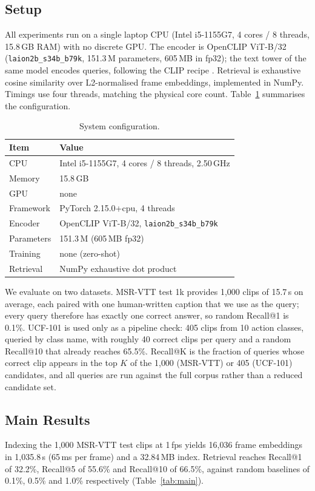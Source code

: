 \documentclass[journal]{IEEEtran}
\begin{document}
\subsection{Setup}
All experiments run on a single laptop CPU (Intel i5-1155G7, 4 cores / 8 threads, 15.8\,GB RAM)
with no discrete GPU. The encoder is OpenCLIP ViT-B/32 \cite{cherti2023reproducible}
(\texttt{laion2b\_s34b\_b79k}, 151.3\,M parameters, 605\,MB in fp32); the text tower of the same
model encodes queries, following the CLIP recipe \cite{radford2021clip}. Retrieval is exhaustive
cosine similarity over L2-normalised frame embeddings, implemented in NumPy. Timings use four
threads, matching the physical core count. Table~\ref{tab:setup} summarises the configuration.

\begin{table}[t]
\centering
\caption{System configuration.}
\label{tab:setup}
\begin{tabular}{@{}ll@{}}
\toprule
Item & Value \\
\midrule
CPU        & Intel i5-1155G7, 4 cores / 8 threads, 2.50\,GHz \\
Memory     & 15.8\,GB \\
GPU        & none \\
Framework  & PyTorch 2.15.0+cpu, 4 threads \\
Encoder    & OpenCLIP ViT-B/32, \texttt{laion2b\_s34b\_b79k} \\
Parameters & 151.3\,M (605\,MB fp32) \\
Training   & none (zero-shot) \\
Retrieval  & NumPy exhaustive dot product \\
\bottomrule
\end{tabular}
\end{table}

We evaluate on two datasets. MSR-VTT test 1k \cite{xu2016msrvtt} provides 1{,}000 clips of
15.7\,s on average, each paired with one human-written caption that we use as the query; every
query therefore has exactly one correct answer, so random Recall@1 is 0.1\%. UCF-101
\cite{soomro2012ucf101} is used only as a pipeline check: 405 clips from 10 action classes,
queried by class name, with roughly 40 correct clips per query and a random Recall@10 that
already reaches 65.5\%. Recall@K is
the fraction of queries whose correct clip appears in the top $K$ of the 1{,}000 (MSR-VTT) or
405 (UCF-101) candidates, and all queries are run against the full corpus rather than a reduced
candidate set.

\subsection{Main Results}
Indexing the 1{,}000 MSR-VTT test clips at 1\,fps yields 16{,}036 frame embeddings in
1{,}035.8\,s (65\,ms per frame) and a 32.84\,MB index. Retrieval reaches Recall@1 of 32.2\%,
Recall@5 of 55.6\% and Recall@10 of 66.5\%, against random baselines of 0.1\%, 0.5\% and 1.0\%
respectively (Table~\ref{tab:main}).
\end{document}
